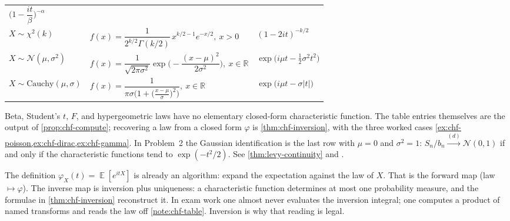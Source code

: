 \documentclass[11pt,a4paper]{article}
\DeclareMathOperator{\E}{\mathbb{E}}
\begin{document}
\begin{note}
\begin{center}
{\begin{tabular}{@{}lll@{}}
\(\displaystyle \bigl(1-\dfrac{it}{\beta}\bigr)^{-\alpha}\) \\
\(X\sim\chi^{2}(k)\) &
\(\displaystyle f(x)=\dfrac{1}{2^{k/2}\Gamma(k/2)}\,x^{k/2-1}e^{-x/2},\ x>0\) &
\(\displaystyle (1-2it)^{-k/2}\) \\
\(X\sim\mathcal{N}(\mu,\sigma^{2})\) &
\(\displaystyle f(x)=\dfrac{1}{\sqrt{2\pi\sigma^{2}}}\exp\bigl(-\dfrac{(x-\mu)^{2}}{2\sigma^{2}}\bigr),\ x\in\mathbb{R}\) &
\(\displaystyle \exp\bigl(i\mu t-\tfrac{1}{2}\sigma^{2} t^{2}\bigr)\) \\
\(X\sim\mathrm{Cauchy}(\mu,\sigma)\) &
\(\displaystyle f(x)=\dfrac{1}{\pi\sigma\bigl(1+\bigl(\frac{x-\mu}{\sigma}\bigr)^{2}\bigr)},\ x\in\mathbb{R}\) &
\(\displaystyle \exp\bigl(i\mu t-\sigma|t|\bigr)\) \\
\bottomrule
\end{tabular}%
}
\end{center}

Beta, Student's \(t\), \(F\), and hypergeometric laws have no elementary closed-form characteristic function. The table entries themselves are the output of \cref{prop:chf-compute}; recovering a law from a closed form \(\varphi\) is \cref{thm:chf-inversion}, with the three worked cases \cref{ex:chf-poisson,ex:chf-dirac,ex:chf-gamma}. In Problem~2 the Gaussian identification is the last row with \(\mu=0\) and \(\sigma^{2}=1\): \(S_{n}/b_{n}\xrightarrow{(d)}\mathcal{N}(0,1)\) if and only if the characteristic functions tend to \(\exp(-t^{2}/2)\). See \cref{thm:levy-continuity} and \citep[Theorem~3.3.6]{durrett2010}.
\end{note}

The definition \(\varphi_{X}(t)=\E[e^{itX}]\) is already an algorithm: expand the expectation against the law of \(X\). That is the forward map (law \(\mapsto\varphi\)). The inverse map is inversion plus uniqueness: a characteristic function determines at most one probability measure, and the formulae in \cref{thm:chf-inversion} reconstruct it. In exam work one almost never evaluates the inversion integral; one computes a product of named transforms and reads the law off \cref{note:chf-table}. Inversion is why that reading is legal.
\end{document}
